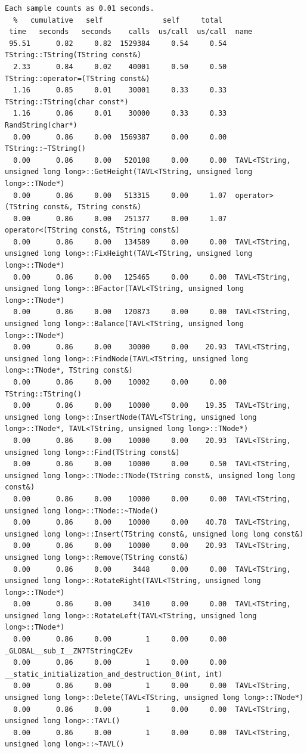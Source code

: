 \documentclass[12pt]{article}
\begin{document}
\begin{Verbatim}[fontsize=\footnotesize,breaklines=true]
Each sample counts as 0.01 seconds.
  %   cumulative   self              self     total
 time   seconds   seconds    calls  us/call  us/call  name
 95.51      0.82     0.82  1529384     0.54     0.54  TString::TString(TString const&)
  2.33      0.84     0.02    40001     0.50     0.50  TString::operator=(TString const&)
  1.16      0.85     0.01    30001     0.33     0.33  TString::TString(char const*)
  1.16      0.86     0.01    30000     0.33     0.33  RandString(char*)
  0.00      0.86     0.00  1569387     0.00     0.00  TString::~TString()
  0.00      0.86     0.00   520108     0.00     0.00  TAVL<TString, unsigned long long>::GetHeight(TAVL<TString, unsigned long long>::TNode*)
  0.00      0.86     0.00   513315     0.00     1.07  operator>(TString const&, TString const&)
  0.00      0.86     0.00   251377     0.00     1.07  operator<(TString const&, TString const&)
  0.00      0.86     0.00   134589     0.00     0.00  TAVL<TString, unsigned long long>::FixHeight(TAVL<TString, unsigned long long>::TNode*)
  0.00      0.86     0.00   125465     0.00     0.00  TAVL<TString, unsigned long long>::BFactor(TAVL<TString, unsigned long long>::TNode*)
  0.00      0.86     0.00   120873     0.00     0.00  TAVL<TString, unsigned long long>::Balance(TAVL<TString, unsigned long long>::TNode*)
  0.00      0.86     0.00    30000     0.00    20.93  TAVL<TString, unsigned long long>::FindNode(TAVL<TString, unsigned long long>::TNode*, TString const&)
  0.00      0.86     0.00    10002     0.00     0.00  TString::TString()
  0.00      0.86     0.00    10000     0.00    19.35  TAVL<TString, unsigned long long>::InsertNode(TAVL<TString, unsigned long long>::TNode*, TAVL<TString, unsigned long long>::TNode*)
  0.00      0.86     0.00    10000     0.00    20.93  TAVL<TString, unsigned long long>::Find(TString const&)
  0.00      0.86     0.00    10000     0.00     0.50  TAVL<TString, unsigned long long>::TNode::TNode(TString const&, unsigned long long const&)
  0.00      0.86     0.00    10000     0.00     0.00  TAVL<TString, unsigned long long>::TNode::~TNode()
  0.00      0.86     0.00    10000     0.00    40.78  TAVL<TString, unsigned long long>::Insert(TString const&, unsigned long long const&)
  0.00      0.86     0.00    10000     0.00    20.93  TAVL<TString, unsigned long long>::Remove(TString const&)
  0.00      0.86     0.00     3448     0.00     0.00  TAVL<TString, unsigned long long>::RotateRight(TAVL<TString, unsigned long long>::TNode*)
  0.00      0.86     0.00     3410     0.00     0.00  TAVL<TString, unsigned long long>::RotateLeft(TAVL<TString, unsigned long long>::TNode*)
  0.00      0.86     0.00        1     0.00     0.00  _GLOBAL__sub_I__ZN7TStringC2Ev
  0.00      0.86     0.00        1     0.00     0.00  __static_initialization_and_destruction_0(int, int)
  0.00      0.86     0.00        1     0.00     0.00  TAVL<TString, unsigned long long>::Delete(TAVL<TString, unsigned long long>::TNode*)
  0.00      0.86     0.00        1     0.00     0.00  TAVL<TString, unsigned long long>::TAVL()
  0.00      0.86     0.00        1     0.00     0.00  TAVL<TString, unsigned long long>::~TAVL()
\end{Verbatim}
\end{document}
